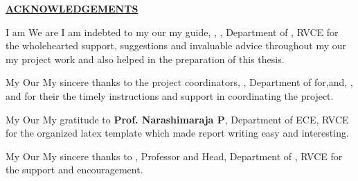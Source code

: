 \thispagestyle{empty}
\ifIDP \vspace{-1cm}\fi
\begin{center}
	\Large\textbf{\underline{ACKNOWLEDGEMENTS}} \par
\end{center}

\ifPG I am \else
\ifStuNameBUsed We are \else I am \fi\fi indebted to \ifPG my \else\ifStuNameBUsed our \else my \fi\fi guide, \textbf{\printGuideNameA}, \printGuideDesigA, Department of \printGuideDeptAInSF, RVCE for the wholehearted support, suggestions and invaluable advice throughout \ifPG my \else\ifStuNameBUsed our \else my \fi\fi project work and also helped in the preparation of this thesis.\\ \par

\ifPG My \else \ifStuNameBUsed Our \else My \fi\fi sincere thanks to the project coordinator\ifIDP\else\ifProjectMemBUsed s\fi\fi\space \textbf{\printProjectMemberA}, \printPanelMemberDesigA, Department of \printProjectMemberDeptAInSF \ifIDP \space for\space \else\ifProjectMemBUsed \ifProjectMemCUsed,\space \else\space and\space \fi\textbf{\printProjectMemberB}, \printPanelMemberDesigB,  \ifProjectMemCUsed\space and \textbf{\printProjectMemberC} \fi\fi\space for \ifProjectMemBUsed their \else the \fi\fi timely instructions and support in coordinating the project.\\ \par

\ifPG My \else \ifStuNameBUsed Our \else My \fi\fi gratitude to \textbf{Prof. Narashimaraja P}, Department of ECE, RVCE for the organized latex template which made report writing easy and interesting.\\ \par


\ifPG My \else \ifStuNameBUsed Our \else My \fi\fi sincere thanks to \textbf{\printHOD}, Professor and Head, Department of \ifIDP \printGuideDeptAInLF\else\printDepartmentLF\fi, RVCE for the support and encouragement.\\ \par

